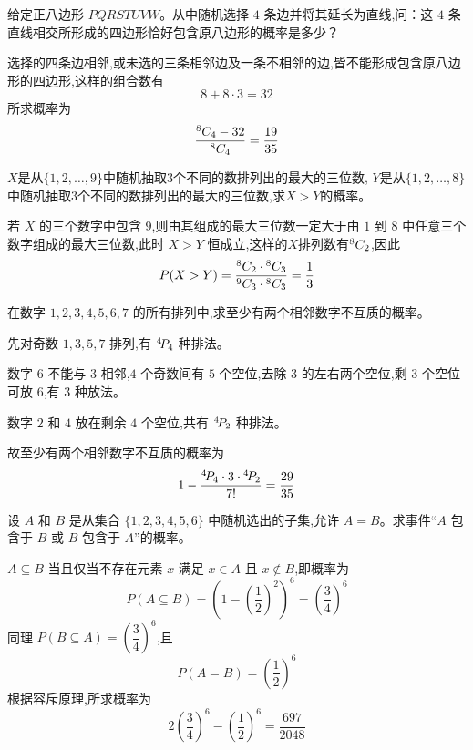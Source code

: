 \begin{questions}
    \question 给定正八边形 $PQRSTUVW$。从中随机选择 $4$ 条边并将其延长为直线,问：这 $4$ 条直线相交所形成的四边形恰好包含原八边形的概率是多少？
    \begin{solution}
        选择的四条边相邻,或未选的三条相邻边及一条不相邻的边,皆不能形成包含原八边形的四边形,这样的组合数有
        \[
        8 + 8 \cdot 3 = 32
        \]
        所求概率为
        \[
        \frac{{}^{8}C_{4}-32}{{}^{8}C_{4}}=\frac{19}{35}
        \]
    \end{solution}
    
    \question $X$是从$\{1,2,\dots,9\}$中随机抽取$3$个不同的数排列出的最大的三位数,
        $Y$是从$\{1,2,\dots,8\}$中随机抽取$3$个不同的数排列出的最大的三位数,求$X>Y$的概率。
    \begin{solution}
        若 $X$ 的三个数字中包含 $9$,则由其组成的最大三位数一定大于由 $1$ 到 $8$ 中任意三个数字组成的最大三位数,此时 $X > Y$ 恒成立,这样的$X$排列数有${}^{8}C_{2}$,因此
        \[
        P(X > Y) = \frac{{}^{8}C_{2} \cdot {}^{8}C_{3}}{{}^{9}C_{3} \cdot {}^{8}C_{3}} = \frac{1}{3}
        \]
    \end{solution}
    
    \question 在数字 $1,2,3,4,5,6,7$ 的所有排列中,求至少有两个相邻数字不互质的概率。
    \begin{solution}
        先对奇数 $1,3,5,7$ 排列,有 ${}^{4}\!P_{4}$ 种排法。
        
        数字 $6$ 不能与 $3$ 相邻,$4$ 个奇数间有 $5$ 个空位,去除 $3$ 的左右两个空位,剩 $3$ 个空位可放 $6$,有 $3$ 种放法。
        
        数字 $2$ 和 $4$ 放在剩余 $4$ 个空位,共有 ${}^{4}\!P_{2} $ 种排法。
        
        故至少有两个相邻数字不互质的概率为
        \[
        1 - \frac{{}^{4}\!P_{4} \cdot 3 \cdot {}^{4}\!P_{2}}{7!} = \frac{29}{35}
        \]
    \end{solution}

    \question 设 $A$ 和 $B$ 是从集合 $\{1,2,3,4,5,6\}$ 中随机选出的子集,允许 $A=B$。求事件“$A$ 包含于 $B$ 或 $B$ 包含于 $A$”的概率。
    \begin{solution}
        $A \subseteq B$ 当且仅当不存在元素 $x$ 满足 $x\in A$ 且 $x\notin B$,即概率为
        \[
        P(A\subseteq B) = \left(1-\left(\frac{1}{2}\right)^2\right)^6 = \left(\dfrac{3}{4}\right)^6
        \]
        同理 $P(B\subseteq A) = \left(\dfrac{3}{4}\right)^6$,且
        \[
        P(A=B) = \left(\frac{1}{2}\right)^6
        \]
        根据容斥原理,所求概率为
        \[
        2\left(\frac{3}{4}\right)^6 - \left(\frac{1}{2}\right)^6 = \frac{697}{2048}
        \]
    \end{solution}


\end{questions}
